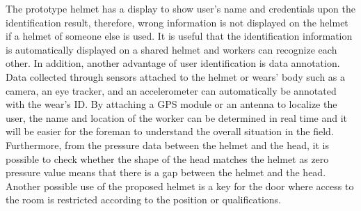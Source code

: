 \documentclass[sigchi,authordraft]{acmart}
\begin{document}
The prototype helmet has a display to show user's name and credentials upon the identification result, therefore, wrong information is not displayed on the helmet if a helmet of someone else is used. It is useful that the identification information is automatically displayed on a shared helmet and workers can recognize each other. In addition, another advantage of user identification is data annotation. Data collected through sensors attached to the helmet or wears' body such as a camera, an eye tracker, and an accelerometer can automatically be annotated with the wear's ID. By attaching a GPS module or an antenna to localize the user\cite{disaster_en}, the name and location of the worker can be determined in real time and it will be easier for the foreman to understand the overall situation in the field. Furthermore, from the pressure data between the helmet and the head, it is possible to check whether the shape of the head matches the helmet as zero pressure value means that there is a gap between the helmet and the head.
Another possible use of the proposed helmet is a key for the door where access to the room is restricted according to the position or qualifications. \par
\end{document}
